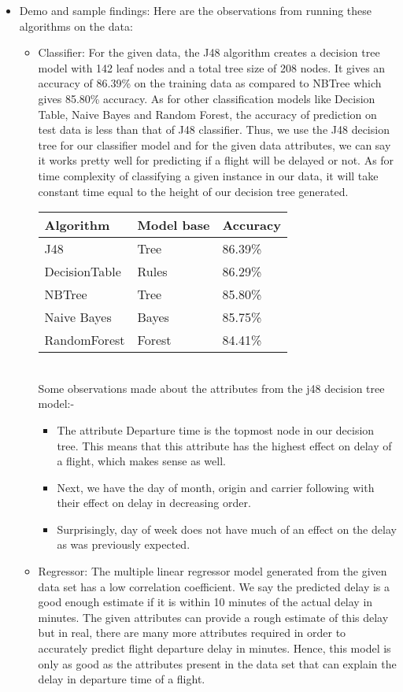 \begin{itemize}
\item{Demo and sample findings: Here are the observations from running these algorithms on the data:}
\begin{itemize} 
\item{Classifier:}
	For the given data, the J48 algorithm creates a decision tree model with 142 leaf nodes and a total tree size of 208 nodes. It gives an accuracy of 86.39\% on the training data as compared to NBTree which gives 85.80\% accuracy. As for other classification models like Decision Table, Naive Bayes and Random Forest, the accuracy of prediction on test data is less than that of J48 classifier. Thus, we use the J48 decision tree for our classifier model and for the given data attributes, we can say it works pretty well for predicting if a flight will be delayed or not. As for time complexity of classifying a given instance in our data, it will take constant time equal to the height of our decision tree generated. \\
\begin{center}
\begin{tabular}{| l | l | l |}
    \hline
    Algorithm & Model base & Accuracy \\ \hline
    J48 & Tree & 86.39\% \\ \hline
    DecisionTable & Rules & 86.29\% \\ \hline
	NBTree & Tree & 85.80\% \\ \hline
	Naive Bayes & Bayes & 85.75\% \\ \hline
	RandomForest & Forest & 84.41\% \\ \hline
    \end{tabular}
\end{center}
    \ \\Some observations made about the attributes from the j48 decision tree model:-
    \begin{itemize}
    \item{The attribute Departure time is the topmost node in our decision tree. This means that this attribute has the highest effect on delay of a flight, which makes sense as well.   }
    \item{Next, we have the day of month, origin and carrier following with their effect on delay in decreasing order.  }
    \item{Surprisingly, day of week does not have much of an effect on the delay as was previously expected.}
    \end{itemize}
\item{Regressor:}
	The multiple linear regressor model generated from the given data set has a low correlation coefficient. We say the predicted delay is a good enough estimate if it is within 10 minutes of the actual delay in minutes. The given attributes can provide a rough estimate of this delay but in real, there are many more attributes required in order to accurately predict flight departure delay in minutes. Hence, this model is only as good as the attributes present in the data set that can explain the delay in departure time of a flight.\\

\end{itemize}
\end{itemize}
